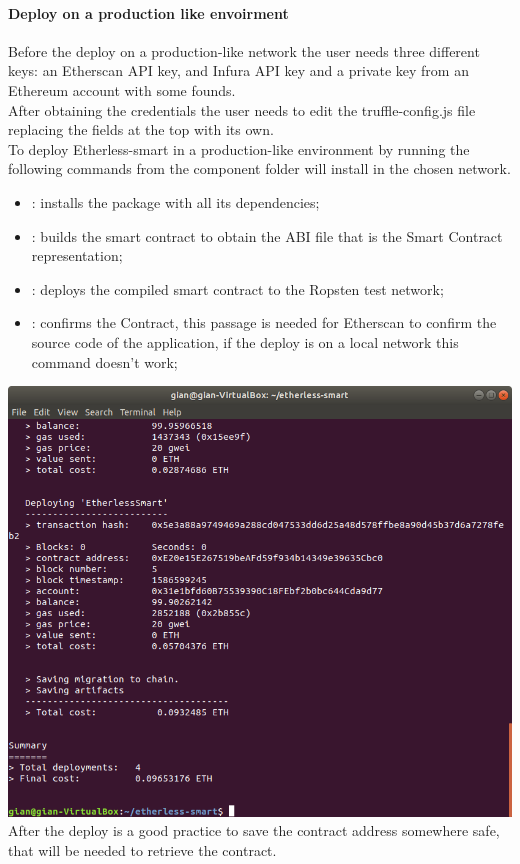 \paragraph{Deploy on a production like envoirment}
Before the deploy on a production-like network the user needs three different keys: an Etherscan API
key, and Infura API key and a private key from an Ethereum account with some founds.\\
After obtaining the credentials the user needs to edit the truffle-config.js file replacing the fields at the top with its own. \\
To deploy Etherless-smart in a production-like environment
by running the following commands from the component folder will install in the chosen network.
\begin{itemize}
    \item {} : installs the package with all its dependencies;
    \item {}: builds the smart contract to obtain the ABI file that is the Smart Contract representation;
    \item {}: deploys the compiled smart contract to the Ropsten test network;
    \item {}: confirms the Contract, this passage is needed for Etherscan to confirm the source code of the application, if the deploy is on a local network this command doesn't work;
\end{itemize}
\includegraphics[width=\textwidth]{res/img/deployContract.png}
After the deploy is a good practice to save the contract address somewhere safe, that will be needed to retrieve the contract.
